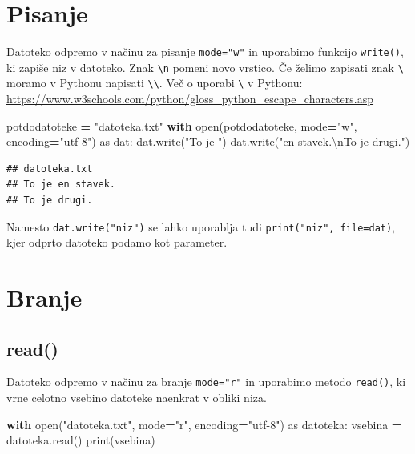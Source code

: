 \documentclass[
]{book}
\newenvironment{Shaded}{\begin{snugshade}}{\end{snugshade}}
\newcommand{\BuiltInTok}[1]{#1}
\newcommand{\CharTok}[1]{\textcolor[rgb]{0.31,0.60,0.02}{#1}}
\newcommand{\ControlFlowTok}[1]{\textcolor[rgb]{0.13,0.29,0.53}{\textbf{#1}}}
\newcommand{\ImportTok}[1]{#1}
\newcommand{\NormalTok}[1]{#1}
\newcommand{\OperatorTok}[1]{\textcolor[rgb]{0.81,0.36,0.00}{\textbf{#1}}}
\newcommand{\StringTok}[1]{\textcolor[rgb]{0.31,0.60,0.02}{#1}}
\begin{document}
\hypertarget{pisanje}{%
\section{Pisanje}\label{pisanje}}

Datoteko odpremo v načinu za pisanje \texttt{mode="w"} in uporabimo funkcijo \texttt{write()},
ki zapiše niz v datoteko. Znak \texttt{\textbackslash{}n} pomeni novo vrstico. Če želimo zapisati znak \texttt{\textbackslash{}}
moramo v Pythonu napisati \texttt{\textbackslash{}\textbackslash{}}. Več o uporabi \texttt{\textbackslash{}} v Pythonu: \url{https://www.w3schools.com/python/gloss_python_escape_characters.asp}

\begin{Shaded}
\begin{Highlighting}[]
\NormalTok{potdodatoteke }\OperatorTok{=} \StringTok{"datoteka.txt"}
\ControlFlowTok{with} \BuiltInTok{open}\NormalTok{(potdodatoteke, mode}\OperatorTok{=}\StringTok{"w"}\NormalTok{, encoding}\OperatorTok{=}\StringTok{"utf{-}8"}\NormalTok{) }\ImportTok{as}\NormalTok{ dat:}
\NormalTok{    dat.write(}\StringTok{"To je "}\NormalTok{)}
\NormalTok{    dat.write(}\StringTok{"en stavek.}\CharTok{\textbackslash{}n}\StringTok{To je drugi."}\NormalTok{)}
\end{Highlighting}
\end{Shaded}

\begin{verbatim}
## datoteka.txt
## To je en stavek.
## To je drugi.
\end{verbatim}

Namesto \texttt{dat.write("niz")} se lahko uporablja tudi \texttt{print("niz",\ file=dat)}, kjer
odprto datoteko podamo kot parameter.

\hypertarget{branje}{%
\section{Branje}\label{branje}}

\hypertarget{read}{%
\subsection{read()}\label{read}}

Datoteko odpremo v načinu za branje \texttt{mode="r"} in uporabimo metodo \texttt{read()},
ki vrne celotno vsebino datoteke naenkrat v obliki niza.

\begin{Shaded}
\begin{Highlighting}[]
\ControlFlowTok{with} \BuiltInTok{open}\NormalTok{(}\StringTok{"datoteka.txt"}\NormalTok{, mode}\OperatorTok{=}\StringTok{"r"}\NormalTok{, encoding}\OperatorTok{=}\StringTok{"utf{-}8"}\NormalTok{) }\ImportTok{as}\NormalTok{ datoteka:}
\NormalTok{    vsebina }\OperatorTok{=}\NormalTok{ datoteka.read()}
\BuiltInTok{print}\NormalTok{(vsebina)}
\end{Highlighting}
\end{Shaded}
\end{document}
